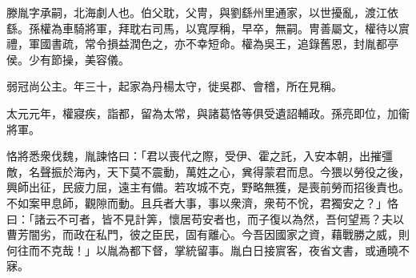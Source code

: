 \begin{pinyinscope}
 
 
 滕胤字承嗣，北海劇人也。伯父耽，父冑，與劉繇州里通家，以世擾亂，渡江依繇。孫權為車騎將軍，拜耽右司馬，以寬厚稱，早卒，無嗣。冑善屬文，權待以賔禮，軍國書疏，常令損益潤色之，亦不幸短命。權為吳王，追錄舊恩，封胤都亭侯。少有節操，美容儀。
 
 
 弱冠尚公主。年三十，起家為丹楊太守，徙吳郡、會稽，所在見稱。
 
 
 
 
 太元元年，權寢疾，詣都，留為太常，與諸葛恪等俱受遺詔輔政。孫亮即位，加衞將軍。
 
 
恪將悉衆伐魏，胤諫恪曰：「君以喪代之際，受伊、霍之託，入安本朝，出摧彊敵，名聲振於海內，天下莫不震動，萬姓之心，兾得蒙君而息。今猥以勞役之後，興師出征，民疲力屈，遠主有備。若攻城不克，野略無獲，是喪前勞而招後責也。不如案甲息師，觀隙而動。且兵者大事，事以衆濟，衆苟不恱，君獨安之？」恪曰：「諸云不可者，皆不見計筭，懷居苟安者也，而子復以為然，吾何望焉？夫以曹芳闇劣，而政在私門，彼之臣民，固有離心。今吾因國家之資，藉戰勝之威，則何往而不克哉！」以胤為都下督，掌統留事。胤白日接賔客，夜省文書，或通曉不寐。
 
 
\end{pinyinscope}